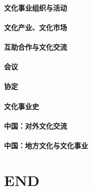 \documentclass[UTF8]{../../ApplicationUniverse}
\begin{document}
\subsubsection{文化事业组织与活动}
\subsubsection{文化产业、文化市场}
\subsubsection{互助合作与文化交流}
\subsubsection{会议}
\subsubsection{协定}
\subsubsection{文化事业史}



\subsubsection{中国：对外文化交流}
\subsubsection{中国：地方文化与文化事业}


\chapter{END}
\end{document}
